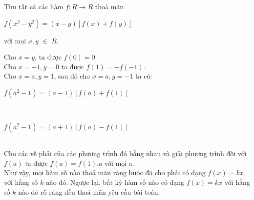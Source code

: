 \begin{baitap}
Tìm tất cả các hàm $f:R\rightarrow R$ thoả mãn\\
 \centerline {$f(x^{2}-y^{2})=(x-y)\left[f(x)+f(y)\right]$}
với mọi $x, y$ $\in$ $R$.

\begin{loigiai2}
Cho $x=y$, ta được $f(0)=0$.\\
Cho $x=-1, y=0$ ta được $f(1)=-f(-1)$.\\
Cho $x=a, y=1$, sau đó cho $x=a, y=-1$ ta có:\\
\centerline {$f(a^{2}-1)=(a-1)\left[f(a)+f(1)\right]$}\\
\centerline {$f(a^{2}-1)=(a+1)\left[f(a)-f(1)\right]$}\\
Cho các vế phải của các phương trình đó bằng nhau và giải phương trình đối với $f(a)$ ta được $f(a)=f(1).a$ với mọi a.\\
Như vậy, mọi hàm số nào thoả mãn ràng buộc đã cho phải có dạng $f(x)=kx$ với hằng số $k$ nào đó. 
Ngược lại, bất kỳ hàm số nào có dạng $f(x)=kx$ với hằng số $k$ nào đó rõ ràng đều thoả mãn yêu cầu bài toán.
\end{loigiai2}
\end{baitap}

